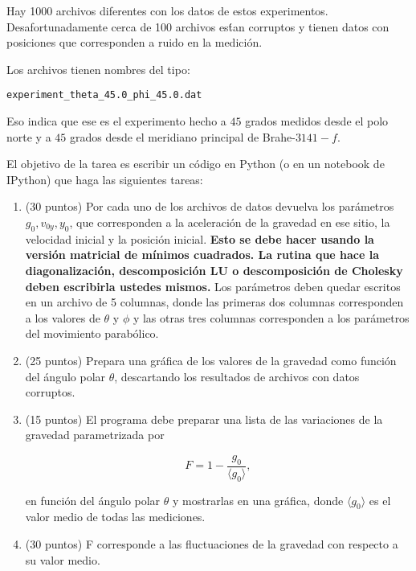 \documentclass{article}
\begin{document}
Hay 1000 archivos
diferentes con los datos de estos experimentos. Desafortunadamente
cerca de 100 archivos es\'tan corruptos y tienen datos con posiciones
que corresponden a ruido en la medici\'on.

Los archivos tienen nombres del tipo:
\begin{center}
\verb"experiment_theta_45.0_phi_45.0.dat"\\
\end{center}

Eso indica que ese es el experimento hecho a
$45$ grados medidos desde el polo norte y a $45$ grados desde el
meridiano principal de Brahe-$3141-f$.


El objetivo de la tarea es escribir un c\'odigo en Python (o en un
notebook de IPython) que haga las siguientes tareas:
\begin{enumerate}

\item (30 puntos)
Por cada uno de los archivos de datos devuelva los par\'ametros
$g_0,v_{0y}, y_{0}$, que corresponden a la aceleraci\'on de la gravedad
en ese sitio, la velocidad inicial y la posici\'on inicial. {\bf Esto se debe
hacer usando la versi\'on matricial de m\'inimos cuadrados. La rutina
que hace la diagonalizaci\'on, descomposici\'on LU o descomposici\'on de Cholesky deben escribirla
ustedes mismos.} Los par\'ametros deben quedar escritos en un archivo
de 5 columnas, donde las primeras dos columnas corresponden a los
valores de $\theta$ y $\phi$ y las otras tres columnas corresponden a
los par\'ametros del movimiento parab\'olico. 


\item (25 puntos)
Prepara una gr\'afica de los valores de la gravedad como funci\'on del
\'angulo polar $\theta$, descartando los resultados de archivos con
datos corruptos.

\item (15 puntos)
El programa debe preparar una lista de las variaciones de la gravedad
parametrizada por 

\begin{displaymath}
F=1-\frac{g_{0}}{\langle g_{0}\rangle},
\end{displaymath}

en funci\'on del \'angulo polar $\theta$ y mostrarlas en una
gr\'afica, donde $\langle g_{0} \rangle$ es el valor medio de todas las mediciones. 

\item (30 puntos)
F corresponde a las fluctuaciones de la gravedad con respecto a su
valor medio.


\end{enumerate}
\end{document}
